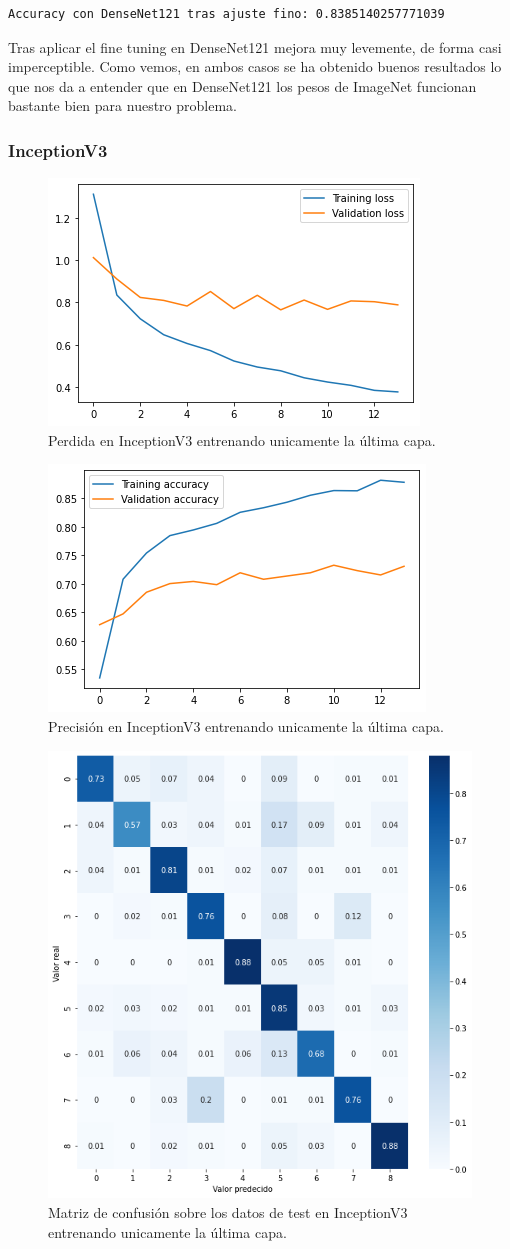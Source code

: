 \begin{lstlisting}
Accuracy con DenseNet121 tras ajuste fino: 0.8385140257771039
\end{lstlisting}

Tras aplicar el fine tuning en DenseNet121 mejora muy levemente, de forma casi imperceptible. Como vemos, en ambos casos se ha obtenido buenos resultados lo que nos da a entender que en DenseNet121 los pesos de ImageNet funcionan bastante bien para nuestro problema.


\subsubsection{InceptionV3}

\begin{figure}[H]
  \centering
  \includegraphics[width=0.5\linewidth]{Imagenes/entrenamiento_redes/ult/inception_ult_loss.png}
  \caption{Perdida en InceptionV3 entrenando unicamente la última capa.}
\end{figure}

\begin{figure}[H]
  \centering
  \includegraphics[width=0.5\linewidth]{Imagenes/entrenamiento_redes/ult/inception_ult_acc.png}
  \caption{Precisión en InceptionV3 entrenando unicamente la última capa.}
\end{figure}

\begin{figure}[H]
  \centering
  \includegraphics[width=0.5\linewidth]{Imagenes/entrenamiento_redes/ult/inception_ult_matriz.png}
  \caption{Matriz de confusión sobre los datos de test en InceptionV3 entrenando unicamente la última capa.}
\end{figure}


